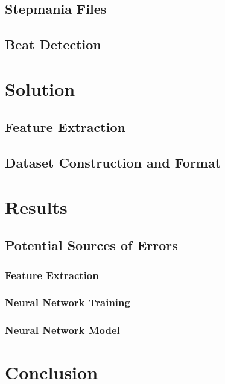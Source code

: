 \documentclass[12pt]{article}
\begin{document}
\subsection{Stepmania Files}



\subsection{Beat Detection}


\section{Solution}


\subsection{Feature Extraction}


\subsection{Dataset Construction and Format}



\pagebreak
\section{Results}


\subsection{Potential Sources of Errors}

\subsubsection{Feature Extraction}


\subsubsection{Neural Network Training}

\subsubsection{Neural Network Model}


\pagebreak
\section{Conclusion}


\pagebreak


\end{document}
